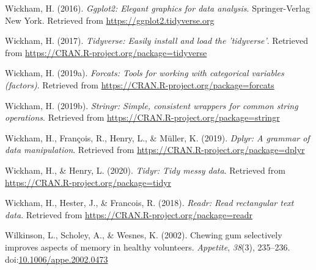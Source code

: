 \documentclass[
  english,
  man]{apa6}
\begin{document}
\leavevmode\hypertarget{ref-R-ggplot2}{}%
Wickham, H. (2016). \emph{Ggplot2: Elegant graphics for data analysis}. Springer-Verlag New York. Retrieved from \url{https://ggplot2.tidyverse.org}

\leavevmode\hypertarget{ref-R-tidyverse}{}%
Wickham, H. (2017). \emph{Tidyverse: Easily install and load the 'tidyverse'}. Retrieved from \url{https://CRAN.R-project.org/package=tidyverse}

\leavevmode\hypertarget{ref-R-forcats}{}%
Wickham, H. (2019a). \emph{Forcats: Tools for working with categorical variables (factors)}. Retrieved from \url{https://CRAN.R-project.org/package=forcats}

\leavevmode\hypertarget{ref-R-stringr}{}%
Wickham, H. (2019b). \emph{Stringr: Simple, consistent wrappers for common string operations}. Retrieved from \url{https://CRAN.R-project.org/package=stringr}

\leavevmode\hypertarget{ref-R-dplyr}{}%
Wickham, H., François, R., Henry, L., \& Müller, K. (2019). \emph{Dplyr: A grammar of data manipulation}. Retrieved from \url{https://CRAN.R-project.org/package=dplyr}

\leavevmode\hypertarget{ref-R-tidyr}{}%
Wickham, H., \& Henry, L. (2020). \emph{Tidyr: Tidy messy data}. Retrieved from \url{https://CRAN.R-project.org/package=tidyr}

\leavevmode\hypertarget{ref-R-readr}{}%
Wickham, H., Hester, J., \& Francois, R. (2018). \emph{Readr: Read rectangular text data}. Retrieved from \url{https://CRAN.R-project.org/package=readr}

\leavevmode\hypertarget{ref-wilkinsonChewingGumSelectively2002}{}%
Wilkinson, L., Scholey, A., \& Wesnes, K. (2002). Chewing gum selectively improves aspects of memory in healthy volunteers. \emph{Appetite}, \emph{38}(3), 235--236. doi:\href{https://doi.org/10.1006/appe.2002.0473}{10.1006/appe.2002.0473}

\endgroup
\end{document}
